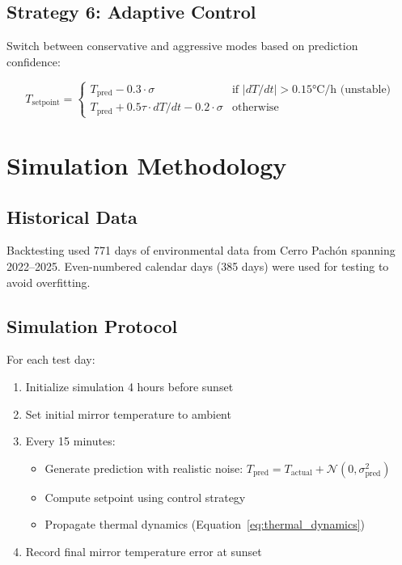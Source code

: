 \documentclass[11pt,letterpaper]{article}
\begin{document}
\subsection{Strategy 6: Adaptive Control}

Switch between conservative and aggressive modes based on prediction confidence:

\begin{equation}
T_{\text{setpoint}} = \begin{cases}
T_{\text{pred}} - 0.3 \cdot \sigma & \text{if } |dT/dt| > 0.15\text{°C/h (unstable)} \\
T_{\text{pred}} + 0.5\tau \cdot dT/dt - 0.2 \cdot \sigma & \text{otherwise}
\end{cases}
\end{equation}

\section{Simulation Methodology}

\subsection{Historical Data}

Backtesting used 771 days of environmental data from Cerro Pachón spanning 2022--2025. Even-numbered calendar days (385 days) were used for testing to avoid overfitting.

\subsection{Simulation Protocol}

For each test day:
\begin{enumerate}
    \item Initialize simulation 4 hours before sunset
    \item Set initial mirror temperature to ambient
    \item Every 15 minutes:
    \begin{itemize}
        \item Generate prediction with realistic noise: $T_{\text{pred}} = T_{\text{actual}} + \mathcal{N}(0, \sigma_{\text{pred}}^2)$
        \item Compute setpoint using control strategy
        \item Propagate thermal dynamics (Equation~\ref{eq:thermal_dynamics})
    \end{itemize}
    \item Record final mirror temperature error at sunset
\end{enumerate}
\end{document}
